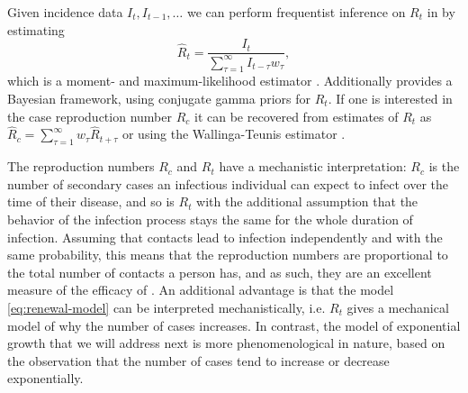 Given incidence data $I_{t}, I_{t - 1}, \dots $ we can perform frequentist inference on $R_{t}$ in  by estimating
$$
    \hat R_{t} = \frac{I_{t}}{\sum_{\tau = 1}^{\infty} I_{t - \tau} w_{\tau}},
$$
which is a moment- and maximum-likelihood estimator \citep{Hotz2020Monitoring}. Additionally \citep{Cori2021EpiEstim} provides a Bayesian framework, using conjugate gamma priors for $R_{t}$. If one is interested in the case reproduction number $R_{c}$ it can be recovered from estimates of $R_{t}$ as $\hat R_{c} = \sum_{\tau = 1}^\infty w_{\tau} \hat R_{t + \tau}$ or using the Wallinga-Teunis estimator \citep{Wallinga2004Different}.

The reproduction numbers $R_{c}$ and $R_{t}$ have a mechanistic interpretation: $R_{c}$ is the number of secondary cases an infectious individual can expect to infect over the time of their disease, and so is $R_{t}$ with the additional assumption that the behavior of the infection process stays the same for the whole duration of infection. 
Assuming that contacts lead to infection independently and with the same probability, this means that the reproduction numbers are proportional to the total number of contacts a person has, and as such, they are an excellent measure of the efficacy of  \citep{Brauner2021Inferring,Khazaei2023Using,Flaxman2020Estimating}. 
An additional advantage is that the model \eqref{eq:renewal-model} can be interpreted mechanistically, i.e. $R_{t}$ gives a mechanical model of why the number of cases increases. In contrast, the  model of exponential growth that we will address next is more phenomenological in nature, based on the observation that the number of cases tend to increase or decrease exponentially. 

